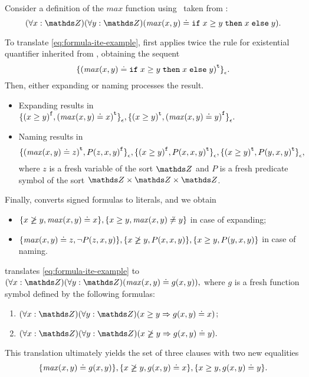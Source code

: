\begin{example} Consider a definition of the $\mathit{max}$ function using \ITE\ taken from \cite{VampireAndFOOL}:
\begin{equation}\label{eq:formula-ite-example}
  (\forall x:\Z)(\forall y:\Z)(\mathit{max}(x, y) \eql \ite{x \geq y}{x}{y}).
\end{equation}

To translate \eqref{eq:formula-ite-example}, \nfcnf{} first applies twice the rule for existential quantifier inherited from \newcnf, obtaining the sequent $${ \{ {(\mathit{max}(x, y) \doteq \mathtt{if}\;{x \geq y}\;\allowbreak\mathtt{then}\;{x}\;\allowbreak\mathtt{else}\;{y})}^{\mathtt{t}} \} }_{\epsilon}.$$ Then, either expanding or naming processes the result.
\begin{itemize}
  \item Expanding results in ${ \{ {(x \geq y)}^{\mathtt{f}}, {(\mathit{max}(x,y) \doteq x)}^{\mathtt{t}} \} }_{\epsilon},
  { \{ {(x \geq y)}^{\mathtt{t}}, {(\mathit{max}(x,y) \doteq y)}^{\mathtt{f}} \} }_{\epsilon}.$
  \item Naming results in $${ \{ {(\mathit{max}(x,y)\doteq z)}^{\mathtt{t}}, {P(z, x, y)}^{\mathtt{f}} \} }_{\epsilon},
  { \{ {(x \geq y)}^{\mathtt{f}}, {P(x,x,y)}^{\mathtt{t}} \} }_{\epsilon},
  { \{ {(x \geq y)}^{\mathtt{t}}, {P(y,x,y)}^{\mathtt{t}} \} }_{\epsilon},$$ where $z$ is a fresh variable of the sort $\Z$ and $P$ is a fresh predicate symbol of the sort $\Z \times \Z \times \Z$.
\end{itemize}

Finally, \newcnf{} converts signed formulas to literals, and we obtain
\begin{itemize}
  \item $\{ x \not\geq y, \mathit{max}(x,y) \doteq x \}, \{ x \geq y, \mathit{max}(x,y) \not\doteq y \}$ in case of expanding;
  \item $\{ \mathit{max}(x,y)\doteq z, \neg P(z, x, y) \},
  \{ x \not\geq y, P(x,x,y) \},
  \{ x \geq y, P(y,x,y) \}$ in case of naming.
\end{itemize}

\oldcnf{} translates \eqref{eq:formula-ite-example} to $(\forall x:\Z)(\forall y:\Z)(\mathit{max}(x, y) \eql g(x, y)),$ where $g$ is a fresh function symbol defined by the following formulas:
\begin{enumerate}
  \item $(\forall x:\Z)(\forall y:\Z)(x \geq y \implies g(x, y) \eql x)$;
  \item $(\forall x:\Z)(\forall y:\Z)(x \not\geq y \implies g(x, y) \eql y).$
\end{enumerate}
This translation ultimately yields the set of three clauses with two new equalities $$\{\mathit{max}(x,y) \doteq g(x,y)\}, \{x \not\geq y, g(x,y) \doteq x\}, \{x \geq y, g(x,y) \doteq y\}.$$
\QED\end{example}

